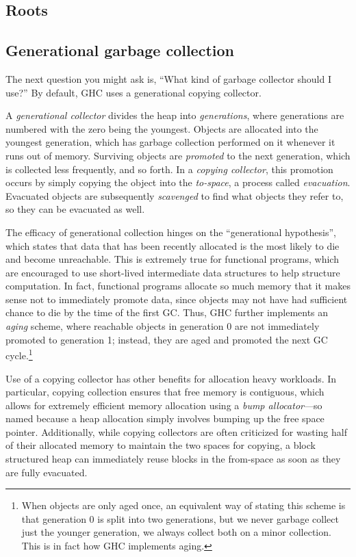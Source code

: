 \subsection{Roots}


\subsection{Generational garbage collection}

The next question you might ask is, ``What kind of garbage collector
should I use?''  By default, GHC uses a generational copying collector.

A \emph{generational collector} divides the heap into
\emph{generations}, where generations are numbered with the zero being
the youngest.  Objects are allocated into the youngest generation, which
has garbage collection performed on it whenever it runs out of memory.
Surviving objects are \emph{promoted} to the next generation, which is
collected less frequently, and so forth.  In a \emph{copying collector}, this
promotion occurs by simply copying the object into the \emph{to-space},
a process called \emph{evacuation}.  Evacuated objects are subsequently
\emph{scavenged} to find what objects they refer to, so they can be evacuated as well.

The efficacy of generational collection hinges on the ``generational
hypothesis'', which states that data that has been recently allocated is
the most likely to die and become unreachable.  This is extremely true
for functional programs, which are encouraged to use short-lived
intermediate data structures to help structure computation.  In fact,
functional programs allocate so much memory that it makes sense not to
immediately promote data, since objects may not have had sufficient
chance to die by the time of the first GC.  Thus, GHC further implements
an \emph{aging} scheme, where reachable objects in generation 0 are not
immediately promoted to generation 1; instead, they are aged and
promoted the next GC cycle.\footnote{When objects are only aged once, an
equivalent way of stating this scheme is that generation 0 is split into
two generations, but we never garbage collect just the younger
generation, we always collect both on a minor collection.  This is in fact
how GHC implements aging.}

Use of a copying collector has other benefits for allocation heavy
workloads.  In particular, copying collection ensures that free memory
is contiguous, which allows for extremely efficient memory allocation
using a \emph{bump allocator}---so named because a heap allocation
simply involves bumping up the free space pointer. Additionally, while
copying collectors are often criticized for wasting half of their
allocated memory to maintain the two spaces for copying, a block
structured heap can immediately reuse blocks in the from-space as soon
as they are fully evacuated.

